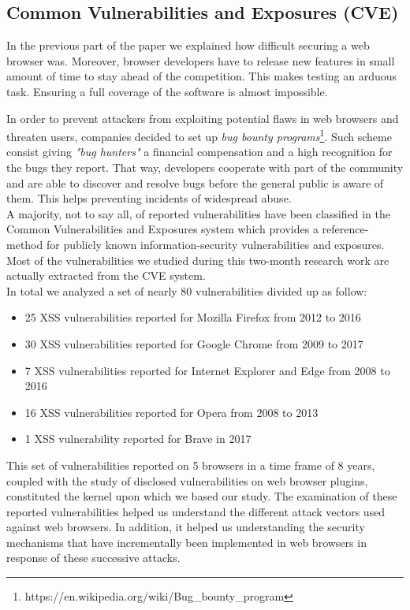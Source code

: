 \documentclass[journal]{IEEEtran}
\begin{document}
\subsection{Common Vulnerabilities and Exposures (CVE)}

In the previous part of the paper we explained how difficult securing a web browser was. Moreover, browser developers have to release new features in small amount of time to stay ahead of the competition. This makes testing an arduous task. Ensuring a full coverage of the software is almost impossible.

\medskip

In order to prevent attackers from exploiting potential flaws in web browsers and threaten users, companies decided to set up \emph{bug bounty programs}\footnote{https://en.wikipedia.org/wiki/Bug\_bounty\_program}. Such scheme consist giving \emph{"bug hunters"} a financial compensation and a high recognition for the bugs they report. That way, developers cooperate with part of the community and are able to discover and resolve bugs before the general public is aware of them. This helps preventing incidents of widespread abuse. \\
A majority, not to say all, of reported vulnerabilities have been classified in the Common Vulnerabilities and Exposures system which provides a reference-method for publicly known information-security vulnerabilities and exposures. \\

Most of the vulnerabilities we studied during this two-month research work are actually extracted from the CVE system. \\

In total we analyzed a set of nearly 80 vulnerabilities divided up as follow:

\begin{itemize}
\item 25 XSS vulnerabilities reported for Mozilla Firefox from 2012 to 2016
\item 30 XSS vulnerabilities reported for Google Chrome from 2009 to 2017
\item 7 XSS vulnerabilities reported for Internet Explorer and Edge from 2008 to 2016
\item 16 XSS vulnerabilities reported for Opera from 2008 to 2013
\item 1 XSS vulnerability reported for Brave in 2017
\end{itemize}

This set of vulnerabilities reported on 5 browsers in a time frame of 8 years, coupled with the study of disclosed vulnerabilities on web browser plugins, constituted the kernel upon which we based our study. The examination of these reported vulnerabilities helped us understand the different attack vectors used against web browsers. In addition, it helped us understanding the security mechanisms that have incrementally been implemented in web browsers in response of these successive attacks.
\end{document}
